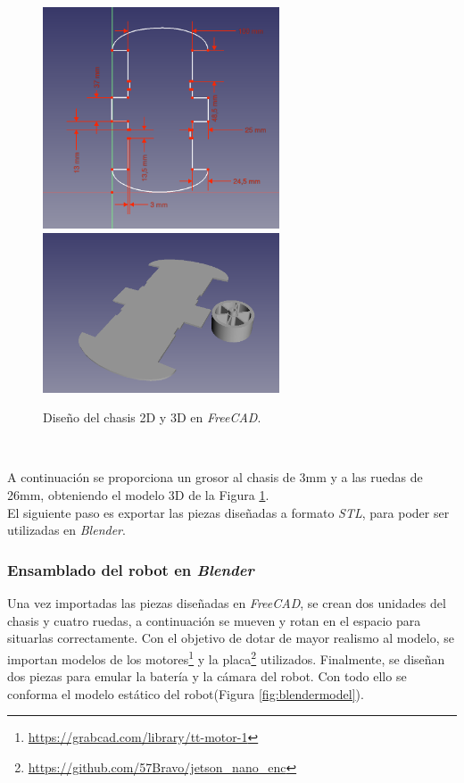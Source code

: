 \begin{figure} [h!]
	\begin{center}
		\includegraphics[width=7cm]{figs/sketchFreecad}\hspace{0.1cm}\includegraphics[width=7cm]{figs/freecad}
	\end{center}
	\caption{Diseño del chasis 2D y 3D en \textit{FreeCAD}.}
	\label{fig:designfreecad}
\end{figure}\

A continuación se proporciona un grosor al chasis de 3mm y a las ruedas de 26mm, obteniendo el modelo 3D de la Figura \ref{fig:designfreecad}.\\

El siguiente paso es exportar las piezas diseñadas a formato \textit{STL}, para poder ser utilizadas en \textit{Blender}.\\

\subsubsection{Ensamblado del robot en \textit{Blender}}
Una vez importadas las piezas diseñadas en \textit{FreeCAD}, se crean dos unidades del chasis y cuatro ruedas, a continuación se mueven y rotan en el espacio para situarlas correctamente. Con el objetivo de dotar de mayor realismo al modelo, se importan modelos de los motores\footnote{\url{https://grabcad.com/library/tt-motor-1}} y la placa\footnote{\url{https://github.com/57Bravo/jetson_nano_enc}} utilizados. Finalmente, se diseñan dos piezas para emular la batería y la cámara del robot. Con todo ello se conforma el modelo estático del robot(Figura \ref{fig:blendermodel}).\\

